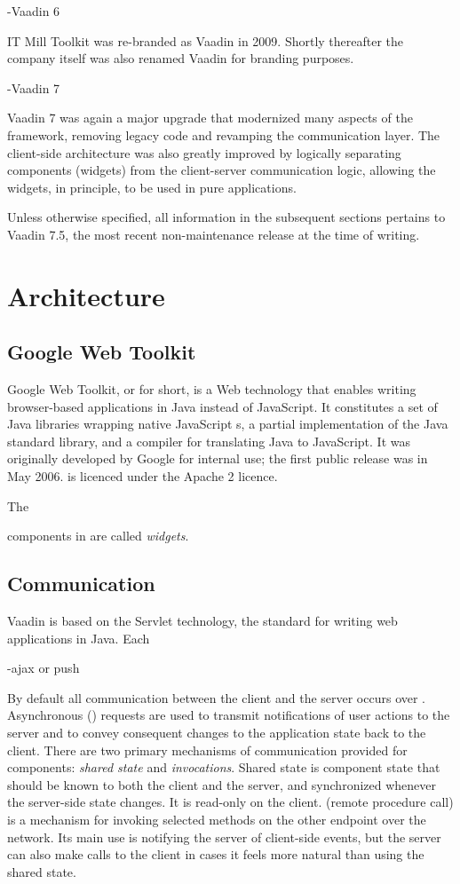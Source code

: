 -Vaadin 6

IT Mill Toolkit was re-branded as Vaadin in 2009. Shortly thereafter the company itself was also renamed Vaadin for branding purposes.

-Vaadin 7

Vaadin 7 was again a major upgrade that modernized many aspects of the framework, removing legacy code and revamping the communication layer. The client-side architecture was also greatly improved by logically separating  components (widgets) from the client-server communication logic, allowing the widgets, in principle, to be used in pure  applications.

Unless otherwise specified, all information in the subsequent sections pertains to Vaadin 7.5, the most recent non-maintenance release at the time of writing.

\section{Architecture}

\subsection{Google Web Toolkit}

Google Web Toolkit, or  for short, is a Web technology that enables writing browser-based applications in Java instead of JavaScript. It constitutes a set of Java libraries wrapping native JavaScript s, a partial implementation of the Java standard library, and a compiler for translating Java to JavaScript. It was originally developed by Google for internal use; the first public release was in May 2006.  is licenced under the Apache 2 licence.

The  

 components in  are called \emph{widgets}.

\subsection{Communication}

Vaadin is based on the Servlet technology, the standard for writing web applications in Java. Each 

-ajax or push

By default all communication between the client and the server occurs over . Asynchronous () requests are used to transmit notifications of user actions to the server and to convey consequent changes to the application state back to the client. There are two primary mechanisms of communication provided for components: \emph{shared state} and \emph{ invocations}. Shared state is component state that should be known to both the client and the server, and synchronized whenever the server-side state changes. It is read-only on the client.  (remote procedure call) is a mechanism for invoking selected methods on the other endpoint over the network. Its main use is notifying the server of client-side events, but the server can also make  calls to the client in cases it feels more natural than using the shared state.


